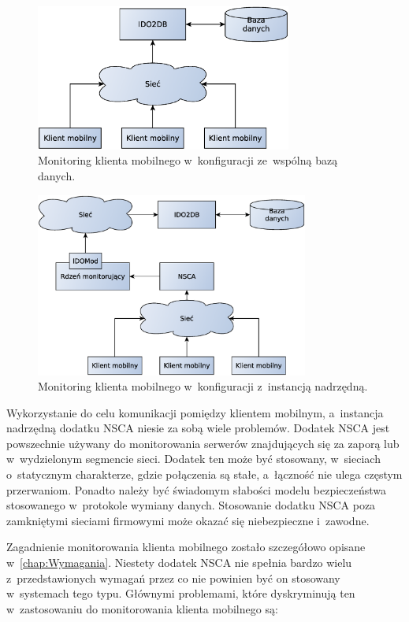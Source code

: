 \begin{figure}[ht]
  \centering
  \caption{Monitoring klienta mobilnego w~konfiguracji ze~wspólną bazą
    danych.}
  \label{fig:mobilnyWspBaza}
\includegraphics[width=0.75\textwidth]{img/mobilnyWspBaza}
\end{figure}

\begin{figure}[ht]
  \centering
  \caption{Monitoring klienta mobilnego w~konfiguracji z~instancją
    nadrzędną.}
  \label{fig:mobilnyInstancja}
\includegraphics[width=0.80\textwidth]{img/mobilnyInstancja}
\end{figure}

Wykorzystanie do celu komunikacji pomiędzy klientem mobilnym,
a~instancja nadrzędną dodatku NSCA niesie za sobą wiele problemów.
Dodatek NSCA jest powszechnie używany do monitorowania serwerów
znajdujących się za zaporą lub w~wydzielonym segmencie sieci. Dodatek
ten może być stosowany, w~sieciach o~statycznym charakterze, gdzie
połączenia są stałe, a~łączność nie ulega częstym przerwaniom. Ponadto
należy być świadomym słabości modelu bezpieczeństwa stosowanego
w~protokole wymiany danych. Stosowanie dodatku NSCA poza zamkniętymi
sieciami firmowymi może okazać się niebezpieczne i~zawodne.

Zagadnienie monitorowania klienta mobilnego zostało szczegółowo
opisane w~\ref{chap:Wymagania}. Niestety dodatek NSCA nie spełnia
bardzo wielu z~przedstawionych wymagań przez co nie powinien być on
stosowany w~systemach tego typu. Głównymi problemami, które
dyskryminują ten w~zastosowaniu do monitorowania klienta mobilnego są:

